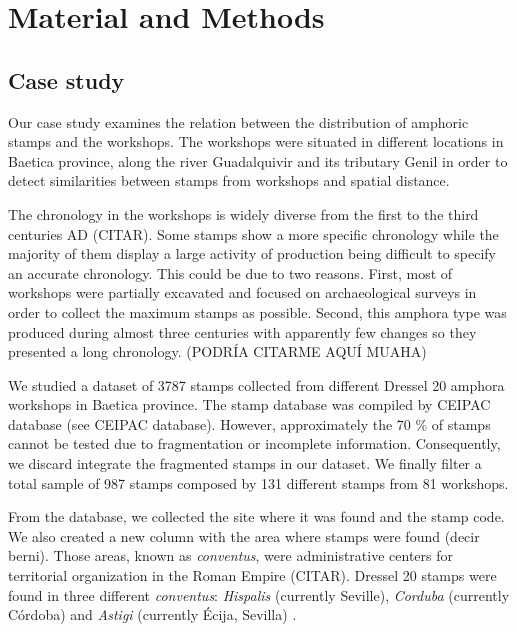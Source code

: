 \documentclass[review]{elsarticle}
\begin{document}




\section{Material and Methods}

\subsection{Case study}

Our case study examines the relation between the distribution of amphoric stamps and the workshops. The workshops were situated in different locations in Baetica province, along the river Guadalquivir and its tributary Genil in order to detect similarities between stamps from workshops and spatial distance. 

The chronology in the workshops is widely diverse from the first to the third centuries AD (CITAR). Some stamps show a more specific chronology while the majority of them display a large activity of production being difficult to specify an accurate chronology. This could be due to two reasons. First, most of workshops were partially excavated and focused on archaeological surveys in order to collect the maximum stamps as possible. Second, this amphora type was produced during almost three centuries with apparently few changes so they presented a long chronology. (PODRÍA CITARME AQUÍ MUAHA)
 
We studied a dataset of 3787 stamps collected from different Dressel 20 amphora workshops in Baetica province. The stamp database was compiled by CEIPAC database \citep{remesal_centro_2015} (see CEIPAC database). However, approximately the 70 \% of stamps cannot be tested due to fragmentation or incomplete information. Consequently, we discard integrate the fragmented stamps in our dataset. We finally filter a total sample of 987 stamps composed by 131 different stamps from 81 workshops. 

From the database, we collected the site where it was found and the stamp code. We also created a new column with the area where stamps were found (decir berni). Those areas, known as \textit{conventus}, were administrative centers for territorial organization in the Roman Empire (CITAR). Dressel 20 stamps were found in three different \textit{conventus}: \textit{Hispalis} (currently Seville), \textit{Corduba} (currently C\'ordoba) and \textit{Astigi} (currently Écija, Sevilla) \citep{rodriguez_economioleicola_1977,chic_datos_2001,berni_millet_epigrafianforica_2008} .
\end{document}
